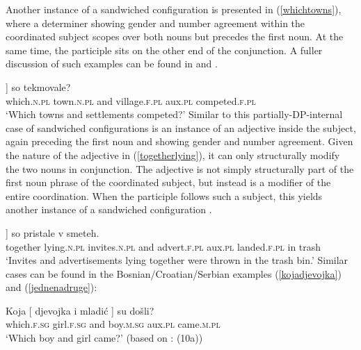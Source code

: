 \documentclass[output=paper
,modfonts
,nonflat]{langsci/langscibook}
\begin{document}
Another instance of a sandwiched configuration is presented in (\ref{whichtowns}), where a determiner showing gender and number agreement within the coordinated subject scopes over both nouns but precedes the first noun. At the same time, the participle sits on the other end of the conjunction. A fuller discussion of such examples can be found in \cite{begovicaljovic:15} and \cite{aljovicbegovic:16}. 

\ea \label{whichtowns}
\gll [ Katera [ mesta in vasi ]] so tekmovale?  \\
{} which.\textsc{n.pl} {} town.\textsc{n.pl} and village.\textsc{f.pl} {} aux.\textsc{pl} competed.\textsc{f.pl}\\
\glt `Which towns and settlements competed?'
\z
Similar to this partially-DP-internal case of sandwiched configurations is an instance of an adjective inside the subject, again preceding the first noun and showing gender and number agreement. Given the nature of the adjective in (\ref{togetherlying}), it can only structurally modify the two nouns in conjunction. The adjective is not simply  structurally part of the first noun phrase of the coordinated subject, but instead is a modifier of the entire coordination. When the participle follows such a subject, this yields another instance of a sandwiched configuration \citep{marusicetalnels:15}.

\ea \label{togetherlying}
\gll [ Skupaj  ležeča   [ vabila         in    reklame ]] so      pristale     v  smeteh. \\
{} together lying.\textsc{n.pl} {} invites.\textsc{n.pl} and advert.\textsc{f.pl} {} aux.\textsc{pl} landed.\textsc{f.pl} in trash\\
\glt `Invites and advertisements lying together were thrown in the trash bin.'
\z
Similar cases can be found in the Bosnian/Croatian/Serbian examples (\ref{kojadjevojka}) and (\ref{jednenadruge}):

\ea \label{kojadjevojka}
\gll Koja [ djevojka i mladić ] su došli? \\
which.\textsc{f.sg} {} girl.\textsc{f.sg} and boy.\textsc{m.sg} {} aux.\textsc{pl} came.\textsc{m.pl}\\
\glt `Which boy and girl came?' (based on \citealt{aljovicbegovic:16}: (10a))
\z
\end{document}
